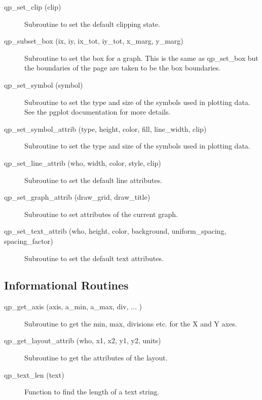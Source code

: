 \begin{description}
\item[qp\_set\_clip (clip)] \Newline 
     Subroutine to set the default clipping state.

\item[qp\_subset\_box (ix, iy, ix\_tot, iy\_tot, x\_marg, y\_marg)] \Newline 
     Subroutine to set the box for a graph. This is the same as
     qp\_set\_box but the boundaries of the page are taken to be the box boundaries.

\item[qp\_set\_symbol (symbol)] \Newline 
     Subroutine to set the type and size of the symbols used in plotting data.
     See the pgplot documentation for more details.

\item[qp\_set\_symbol\_attrib (type, height, color, fill, line\_width, clip)] \Newline 
     Subroutine to set the type and size of the symbols used in plotting data.

\item[qp\_set\_line\_attrib (who, width, color, style, clip)] \Newline 
     Subroutine to set the default line attributes.

\item[qp\_set\_graph\_attrib (draw\_grid, draw\_title)] \Newline 
     Subroutine to set attributes of the current graph.

\item[qp\_set\_text\_attrib (who, height, color, background, 
                                uniform\_spacing, spacing\_factor) ] \Newline 
     Subroutine to set the default text attributes.

\end{description}

\subsection{Informational Routines}

\begin{description}

\item[qp\_get\_axis (axis, a\_min, a\_max, div, ... ) ] \Newline
     Subroutine to get the min, max, divisions etc. for the X and Y axes.

\item[qp\_get\_layout\_attrib (who, x1, x2, y1, y2, units)] \Newline 
     Subroutine to get the attributes of the layout.

\item[qp\_text\_len (text)] \Newline 
     Function to find the length of a text string.

\end{description}

